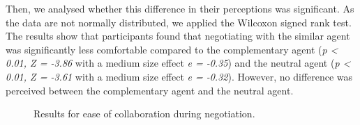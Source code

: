 \documentclass[10pt, a4paper]{article} %
\begin{document}
		Then, we analysed whether this difference in their perceptions was significant. As the data are not normally distributed, we applied the Wilcoxon signed rank test. The results show that participants found that negotiating with the similar agent was significantly less comfortable compared to the complementary agent (\emph{p < 0.01, Z = -3.86} with a medium size effect \emph{e = -0.35}) and the neutral agent (\emph{p < 0.01, Z = -3.61} with a medium size effect \emph{e = -0.32}).
		However, no difference was perceived between the complementary agent and the neutral agent.
		
			\begin{figure}[h]
			
			
			\caption{Results for ease of collaboration during negotiation.}
			\label{fig:aise}
		\end{figure}
	
	
\end{document}
